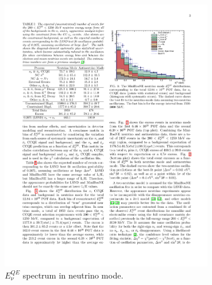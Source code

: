 \begin{figure}[htbp]
  \begin{subfigure}{0.48\textwidth}
    \begin{center}
    \includegraphics[width=\linewidth]{figures/miniboone_plot.pdf}
    \caption{$E_{\nu}^{QE}$ spectrum in neutrino mode.}
    \label{fig:miniboone_spectrum}
    \end{center}
  \end{subfigure}\hfill
  \begin{subfigure}{0.48\textwidth}
    \begin{center}

\end{center}
\end{subfigure}
\end{figure}
